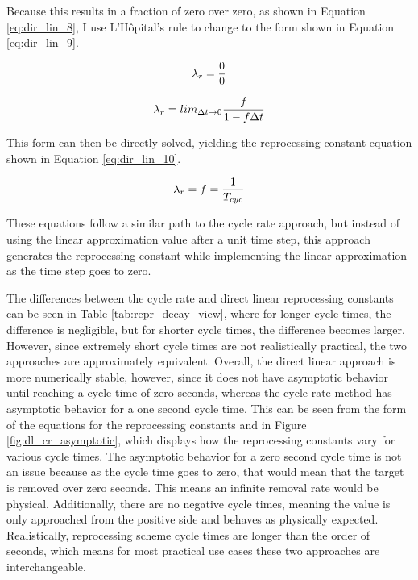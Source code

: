 Because this results in a fraction of zero over zero, as shown in Equation \eqref{eq:dir_lin_8}, I use L'Hôpital's rule to change to the form shown in Equation \eqref{eq:dir_lin_9}.

\begin{equation} \hfill
\lambda_r = \frac{0}{0}
\hfill\label{eq:dir_lin_8} \end{equation}

\begin{equation} \hfill
\lambda_r = lim_{\Delta t \to 0} \frac{f}{1-f\Delta t}
\hfill\label{eq:dir_lin_9} \end{equation}

This form can then be directly solved, yielding the reprocessing constant equation shown in Equation \eqref{eq:dir_lin_10}.

\begin{equation} \hfill
\lambda_r = f = \frac{1}{T_{cyc}}
\hfill\label{eq:dir_lin_10} \end{equation}

These equations follow a similar path to the cycle rate approach, but instead of using the linear approximation value after a unit time step, this approach generates the reprocessing constant while implementing the linear approximation as the time step goes to zero.

The differences between the cycle rate and direct linear reprocessing constants can be seen in Table \ref{tab:repr_decay_view}, where for longer cycle times, the difference is negligible, but for shorter cycle times, the difference becomes larger. However, since extremely short cycle times are not realistically practical, the two approaches are approximately equivalent. Overall, the direct linear approach is more numerically stable, however, since it does not have asymptotic behavior until reaching a cycle time of zero seconds, whereas the cycle rate method has asymptotic behavior for a one second cycle time. This can be seen from the form of the equations for the reprocessing constants and in Figure \ref{fig:dl_cr_asymptotic}, which displays how the reprocessing constants vary for various cycle times. The asymptotic behavior for a zero second cycle time is not an issue because as the cycle time goes to zero, that would mean that the target is removed over zero seconds. This means an infinite removal rate would be physical. Additionally, there are no negative cycle times, meaning the value is only approached from the positive side and behaves as physically expected. Realistically, reprocessing scheme cycle times are longer than the order of seconds, which means for most practical use cases these two approaches are interchangeable.

